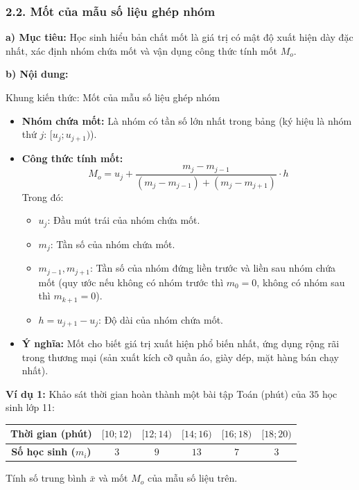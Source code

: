 \documentclass[12pt, a4paper]{article}
\begin{document}
\subsubsection*{2.2. Mốt của mẫu số liệu ghép nhóm}

\noindent \textbf{a) Mục tiêu:}
Học sinh hiểu bản chất mốt là giá trị có mật độ xuất hiện dày đặc nhất, xác định nhóm chứa mốt và vận dụng công thức tính mốt $M_o$.

\noindent \textbf{b) Nội dung:}
\begin{pedabox}{Khung kiến thức: Mốt của mẫu số liệu ghép nhóm}
\begin{itemize}[leftmargin=0.6cm]
    \item \textbf{Nhóm chứa mốt:} Là nhóm có tần số lớn nhất trong bảng (ký hiệu là nhóm thứ $j$: $[u_j; u_{j+1})$).
    \item \textbf{Công thức tính mốt:}
    $$M_o = u_j + \dfrac{m_j - m_{j-1}}{(m_j - m_{j-1}) + (m_j - m_{j+1})} \cdot h$$
    Trong đó:
    \begin{itemize}
        \item $u_j$: Đầu mút trái của nhóm chứa mốt.
        \item $m_j$: Tần số của nhóm chứa mốt.
        \item $m_{j-1}, m_{j+1}$: Tần số của nhóm đứng liền trước và liền sau nhóm chứa mốt (quy ước nếu không có nhóm trước thì $m_0 = 0$, không có nhóm sau thì $m_{k+1} = 0$).
        \item $h = u_{j+1} - u_j$: Độ dài của nhóm chứa mốt.
    \end{itemize}
    \item \textbf{Ý nghĩa:} Mốt cho biết giá trị xuất hiện phổ biến nhất, ứng dụng rộng rãi trong thương mại (sản xuất kích cỡ quần áo, giày dép, mặt hàng bán chạy nhất).
\end{itemize}
\end{pedabox}

\textbf{Ví dụ 1:} Khảo sát thời gian hoàn thành một bài tập Toán (phút) của $35$ học sinh lớp 11:
\begin{center}
\small
\begin{tabular}{|c|c|c|c|c|c|}
\hline
\textbf{Thời gian (phút)} & $[10; 12)$ & $[12; 14)$ & $[14; 16)$ & $[16; 18)$ & $[18; 20)$ \\ \hline
\textbf{Số học sinh ($m_i$)} & $3$ & $9$ & $13$ & $7$ & $3$ \\ \hline
\end{tabular}
\end{center}
Tính số trung bình $\bar{x}$ và mốt $M_o$ của mẫu số liệu trên.
\end{document}
